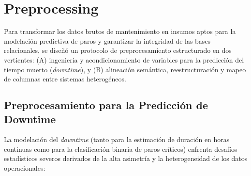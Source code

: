 \documentclass[conference]{IEEEtran}
\begin{document}
\section{Preprocessing}
\label{sec:preprocessing}
Para transformar los datos brutos de mantenimiento en insumos aptos para la modelación predictiva de paros y garantizar la integridad de las bases relacionales, se diseñó un protocolo de preprocesamiento estructurado en dos vertientes: (A) ingeniería y acondicionamiento de variables para la predicción del tiempo muerto (\textit{downtime}), y (B) alineación semántica, reestructuración y mapeo de columnas entre sistemas heterogéneos.

\subsection{Preprocesamiento para la Predicción de Downtime}
La modelación del \textit{downtime} (tanto para la estimación de duración en horas continuas como para la clasificación binaria de paros críticos) enfrenta desafíos estadísticos severos derivados de la alta asimetría y la heterogeneidad de los datos operacionales:
\end{document}
